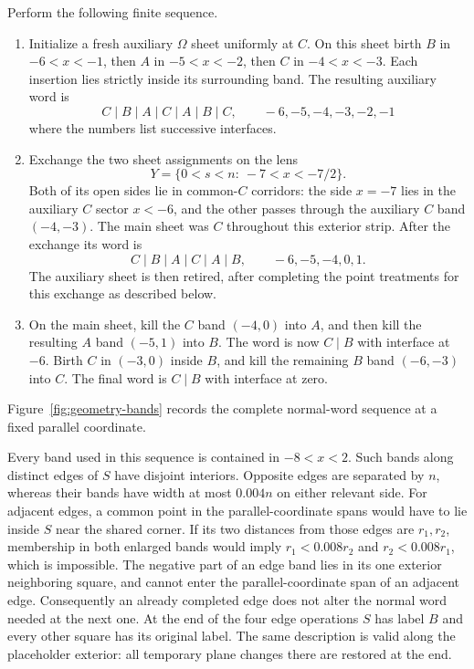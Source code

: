 Perform the following finite sequence.
\begin{enumerate}
\item
Initialize a fresh auxiliary $\Omega$ sheet uniformly at $C$.  On this
sheet birth $B$ in $-6<x<-1$, then $A$ in $-5<x<-2$, then $C$ in
$-4<x<-3$.  Each insertion lies strictly inside its surrounding band.
The resulting auxiliary word is
\begin{equation}
 C\mid B\mid A\mid C\mid A\mid B\mid C,
 \qquad -6,-5,-4,-3,-2,-1
 \label{eq:geometry-aux-word}
\end{equation}
where the numbers list successive interfaces.
\item
Exchange the two sheet assignments on the lens
\begin{equation}
 Y=\{0<s<n:\ -7<x<-7/2\}.
 \label{eq:geometry-lens}
\end{equation}
Both of its open sides lie in common-$C$ corridors: the side $x=-7$
lies in the auxiliary $C$ sector $x<-6$, and the other passes
through the auxiliary $C$ band $(-4,-3)$.  The main sheet was $C$
throughout this exterior strip.  After the exchange its word is
\begin{equation}
 C\mid B\mid A\mid C\mid A\mid B,
 \qquad -6,-5,-4,0,1.
 \label{eq:geometry-main-word}
\end{equation}
The auxiliary sheet is then retired, after completing the point
treatments for this exchange as described below.
\item
On the main sheet, kill the $C$ band $(-4,0)$ into $A$, and then kill
the resulting $A$ band $(-5,1)$ into $B$.  The word is now $C\mid B$
with interface at $-6$.  Birth $C$ in $(-3,0)$ inside $B$, and kill
the remaining $B$ band $(-6,-3)$ into $C$.  The final word is
$C\mid B$ with interface at zero.
\end{enumerate}

Figure~\ref{fig:geometry-bands} records the complete normal-word
sequence at a fixed parallel coordinate.


Every band used in this sequence is contained in $-8<x<2$.  Such
bands along distinct edges of $S$ have disjoint interiors.  Opposite
edges are separated by $n$, whereas their bands have width at most
$0.004n$ on either relevant side.  For adjacent edges, a common point
in the parallel-coordinate spans would have to lie inside $S$ near
the shared corner.  If its two distances from those edges are $r_1,r_2$,
membership in both enlarged bands would imply
$r_1<0.008r_2$ and $r_2<0.008r_1$, which is impossible.  The negative
part of an edge band lies in its one exterior neighboring square, and
cannot enter the parallel-coordinate span of an adjacent edge.
Consequently an already completed edge does not alter the normal word
needed at the next one.  At the end of the four edge operations $S$
has label $B$ and every other square has its original label.  The same
description is valid along the placeholder exterior: all temporary
plane changes there are restored at the end.

